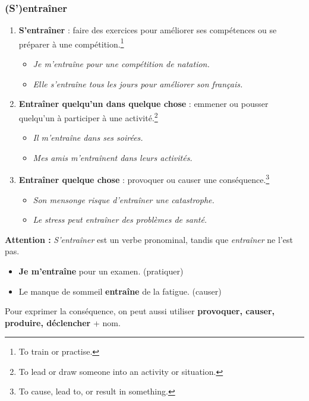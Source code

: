 \documentclass[math,code]{amznotes}
\theoremstyle{remark}
\begin{document}
\subsubsection*{(S')entraîner}

\begin{enumerate}
    \item \textbf{S'entraîner} : faire des exercices pour améliorer ses compétences ou se préparer à une compétition.\footnote{To train or practise.}
    \begin{itemize}
        \item \textit{Je m'entraîne pour une compétition de natation.}
        \item \textit{Elle s'entraîne tous les jours pour améliorer son français.}
    \end{itemize}

    \item \textbf{Entraîner quelqu'un dans quelque chose} : emmener ou pousser quelqu'un à participer à une activité.\footnote{To lead or draw someone into an activity or situation.}
    \begin{itemize}
        \item \textit{Il m'entraîne dans ses soirées.}
        \item \textit{Mes amis m'entraînent dans leurs activités.}
    \end{itemize}

    \item \textbf{Entraîner quelque chose} : provoquer ou causer une conséquence.\footnote{To cause, lead to, or result in something.}
    \begin{itemize}
        \item \textit{Son mensonge risque d'entraîner une catastrophe.}
        \item \textit{Le stress peut entraîner des problèmes de santé.}
    \end{itemize}
\end{enumerate}

\begin{notebox}
\textbf{Attention :} \textit{S'entraîner} est un verbe pronominal, tandis que \textit{entraîner} ne l'est pas.

\begin{itemize}
    \item \textbf{Je m'entraîne} pour un examen. (pratiquer)
    \item Le manque de sommeil \textbf{entraîne} de la fatigue. (causer)
\end{itemize}

Pour exprimer la conséquence, on peut aussi utiliser \textbf{provoquer, causer, produire, déclencher} + nom.
\end{notebox}
\end{document}
